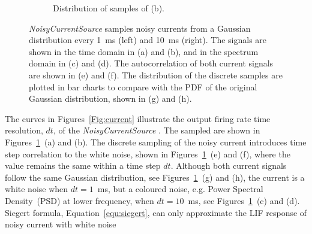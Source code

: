 \begin{figure}[tbp!]
\begin{subfigure}[t]{0.43\textwidth}
			\caption{Distribution of samples of (b).}
		\end{subfigure}
		\caption[\textit{NoisyCurrentSource} samples from a Gaussian distribution.]{\textit{NoisyCurrentSource} samples noisy currents from a Gaussian distribution every 1~ms (left) and 10~ms (right). The signals are shown in the time domain in (a) and (b), and in the spectrum domain in (c) and (d). The autocorrelation of both current signals are shown in (e) and (f). The distribution of the discrete samples are plotted in bar charts to compare with the PDF of the original Gaussian distribution, shown in (g) and (h).}
		\label{Fig:lif_curr}
	\end{figure}

	The \DIFaddbegin {}\DIFaddend curves in Figures~\ref{Fig:current} illustrate the output firing rate \DIFdelbegin {}\DIFdelend \DIFaddbegin {}\DIFaddend time resolution, $dt$, of the \textit{NoisyCurrentSource} \DIFaddbegin {}\DIFaddend .
	The sampled \DIFdelbegin {}\DIFdelend \DIFaddbegin {}\textit{}\DIFadd{) }\DIFaddend are shown in Figures~\ref{Fig:lif_curr}~(a) and (b).
	The discrete sampling of the noisy current introduces time step correlation to the white noise, shown in Figures~\ref{Fig:lif_curr}~(e) and (f), where the value remains the same within a time step $dt$.
	Although both current signals follow the same Gaussian distribution, see Figures~\ref{Fig:lif_curr}~(g) and (h), the current is \DIFaddbegin {}\DIFaddend a white noise when $dt=1$~ms, but a coloured noise, e.g. \DIFdelbegin {}\DIFdelend \DIFaddbegin {}\DIFaddend Power Spectral Density~(PSD) at lower frequency, when $dt=10$~ms, see Figures~\ref{Fig:lif_curr}~(c) and (d).
	\DIFdelbegin {}\DIFdelend \DIFaddbegin {}\DIFaddend Siegert formula, Equation~\ref{equ:siegert}, can only approximate the LIF response of noisy current with white noise\DIFdelbegin {}\DIFdelend \DIFaddbegin {}\DIFaddend %
